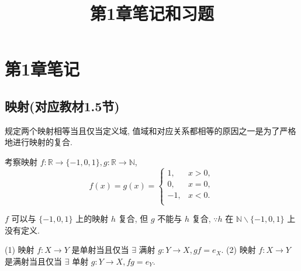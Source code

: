 \documentclass[color=black,device=normal,lang=cn,mode=geye]{elegantnote}
\title{第1章笔记和习题}
\begin{document}
\maketitle
\section{第1章笔记}
\subsection{映射(对应教材1.5节)}
规定两个映射相等当且仅当定义域, 值域和对应关系都相等的原因之一是为了严格地进行映射的复合.
\begin{example}
    考察映射 $f:\mathbb{R}\to\{-1,0,1\},g:\mathbb{R}\to\mathbb{N}$,
    \[f(x)=g(x)=\begin{cases}
        1, & x>0, \\
        0, & x=0, \\
        -1, & x<0. \\
    \end{cases}\]

    $f$ 可以与 $\{-1,0,1\}$ 上的映射 $h$ 复合, 但 $g$ 不能与 $h$ 复合, $\because h$ 在 $\mathbb{N}\backslash\{-1,0,1\}$ 上没有定义.
\end{example}
\begin{theorem}
    (1) 映射 $f:X\to Y$ 是单射当且仅当 $\exists$ 满射 $g:Y\to X,gf=e_X$. (2) 映射 $f:X\to Y$ 是满射当且仅当 $\exists$ 单射 $g:Y\to X,fg=e_Y$.
\end{theorem}
\end{document}
